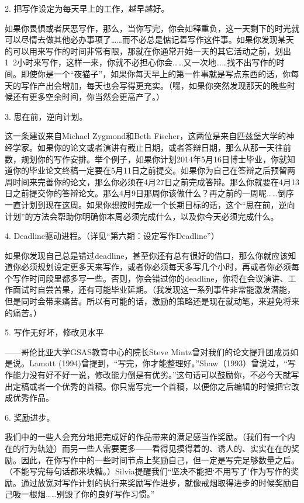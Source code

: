 \documentclass[12pt]{ctexart}
\begin{document}
2. 把写作设定为每天早上的工作，越早越好。

如果你畏惧或者厌恶写作，那么，当你写完，你会如释重负，这一天剩下的时光就可以尽情去做其他必办事项了……而不必总是惦记着写作这件事。如果你发现某天的可以用来写作的时间非常有限，那就在你通常开始一天的其它活动之前，划出1~2小时来写作，这样一来，你就不必担心你会……又一次地……找不出写作的时间。即使你是一个“夜猫子”，如果你每天早上的第一件事就是写点东西的话，你每天的写作产出会增加，每天也会写得更充实。（嘿，如果你突然发现那天的晚些时候还有更多空余时间，你当然会更高产了。）

3. 思在前，逆向计划。

这一条建议来自Michael Zygmond和Beth Fischer，这两位是来自匹兹堡大学的神经学家。如果你的论文或者演讲有截止日期，或者答辩日期，那么从那一天往前数，规划你的写作安排。举个例子，如果你计划2014年5月16日博士毕业，你就知道你的毕业论文终稿一定要在5月11日之前提交。如果你为自己在答辩之后预留两周时间来完善你的论文，那么你必须在4月27日之前完成答辩。那么你就要在4月13日之前提交你的答辩论文。那么4月9日那周你该做什么？再之前的一周呢……倒序一直计划到现在这周。如果你想按时完成一个长期目标的话，这个“思在前，逆向计划”的方法会帮助你明确你本周必须完成什么，以及你今天必须完成什么。

4. Deadline驱动进程。（详见“第六期：设定写作Deadline”）

如果你发现自己总是错过deadline，甚至你还有总有很好的借口，那么你就应该知道你必须规划设定更多天来写作，或者你必须每天多写几个小时，再或者你必须每个写作时间段里都多写一些。否则，你会错过你的deadline，你将在会议演讲、工作面试时自尝苦果，还有可能毕业延期。（我发现这一系列事件非常能激发潜能，但是同时会带来痛苦。所以有可能的话，激励的策略还是现在就动笔，来避免将来的痛苦。）

5. 写作无好坏，修改见水平

——哥伦比亚大学GSAS教育中心的院长Steve Mintz曾对我们的论文提升团成员如是说。Lamott (1994)曾提到，“写完，你才能整理好。”Shaw（1993）曾说过，“写作能力没有好不好一说，修改能力倒是有优劣。”这句话可以鼓励你，不必今天就写出定稿或者一个优秀的首稿。你只需写完一个首稿，以便你之后编辑的时候把它改成优秀作品。

6. 奖励进步。

我们中的一些人会充分地把完成好的作品带来的满足感当作奖励。（我们有一个内在的行为轨迹）而另一些人需要更多——看得见摸得着的、诱人的、实实在在的奖励。因此，在你写作中的一些时间节点上奖励自己，但一定是写完足够数量之后。（不能写完每句话都来块糖。）Silvia提醒我们“坚决不能把‘不用写了’作为写作的奖励。通过放宽对写作计划的执行来奖励写作进步，就像戒烟取得进步的时候奖励自己吸一根烟……别毁了你的良好写作习惯。”
\end{document}
